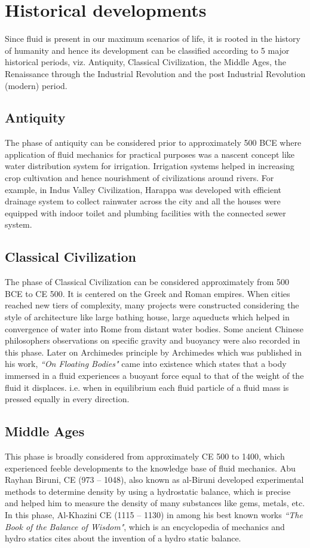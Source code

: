 \documentclass[14pt,one side, a4paper]{extbook}
\begin{document}
	\section{Historical developments}
	Since fluid is present in our maximum scenarios of life, it is rooted in the history of humanity and hence its development can be classified according to 5 major historical periods,\cite{rosentrator} viz. Antiquity, Classical Civilization, the Middle Ages, the Renaissance through the Industrial Revolution and the post Industrial Revolution (modern) period.
	\subsection{Antiquity} The phase of antiquity can be considered prior to approximately 500 BCE where application of fluid mechanics for practical purposes was a nascent concept like water distribution system for irrigation. Irrigation systems helped in increasing crop cultivation and hence nourishment of civilizations around rivers. For example, in Indus Valley Civilization, Harappa was developed with efficient drainage system to collect rainwater across the city and all the houses were equipped with indoor toilet and plumbing facilities with the connected sewer system.
	\subsection{Classical Civilization}The phase of Classical Civilization can be considered approximately from 500 BCE to CE 500. It is centered on the Greek and Roman empires. When cities reached new tiers of complexity, many projects were constructed considering the style of architecture like large bathing house, large aqueducts which helped in convergence of water into Rome from distant water bodies.
	Some ancient Chinese philosophers observations on specific gravity and buoyancy were also recorded in this phase.
	Later on Archimedes principle by Archimedes which was published in his work, \textit{``On Floating Bodies"} came into existence which states that a body immersed in a fluid experiences a buoyant force equal to that of the weight of the fluid it displaces. i.e. when in equilibrium each fluid particle of a fluid mass is pressed equally in every direction.
	\subsection{Middle Ages} 
	This phase is broadly considered from approximately CE 500 to 1400, which experienced feeble developments to the knowledge base of fluid mechanics.
	Abu Rayhan Biruni, CE (973 – 1048), also known as al-Biruni developed experimental methods to determine density by using a hydrostatic balance, which is precise and helped him to measure the density of many substances like  gems, metals, etc.
	In this phase, Al-Khazini CE (1115 – 1130) in among his best known works \textit{``The Book of the Balance of Wisdom"}, which is an encyclopedia of mechanics and hydro statics cites about the invention of a hydro static balance.
\end{document}
